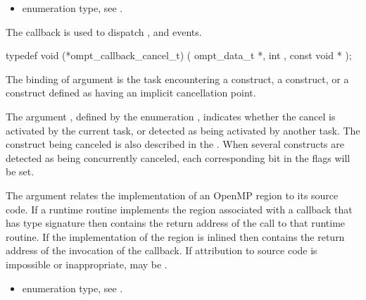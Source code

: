 \begin{itemize}
\begin{itemize}
\crossreferences
\begin{itemize}
\item {} enumeration type, see .
\end{itemize}

\label{sec:ompt_callback_cancel_t}
\summary
The  callback is used to dispatch
,  and  events.

\format

\begin{ccppspecific}
\begin{omptCallback}
typedef void (*ompt_callback_cancel_t) (
  ompt_data_t *,
  int ,
  const void *
);
\end{omptCallback}
\end{ccppspecific}


\argdesc

The binding of argument  is the task
encountering a  construct, a 
construct, or a construct defined as having an implicit cancellation
point.

The argument , defined by the enumeration
, indicates whether the cancel is
activated by the current task, or detected as being activated by
another task.  The construct being canceled is also described in the
. When several constructs are detected as being
concurrently canceled, each corresponding bit in the flags will be
set.

The  argument relates the implementation of an OpenMP region
to its source code. If a runtime routine implements the region associated with
a callback that has type signature  then
 contains the return address of the call to that runtime routine.
If the implementation of the region is inlined then  contains the
return address of the invocation of the callback. If attribution to source code
is impossible or inappropriate, may be .

\crossreferences
\begin{itemize}
\item {} enumeration type, see .
\end{itemize}




\end{itemize}
\end{itemize}
